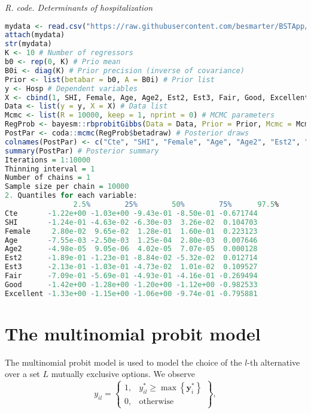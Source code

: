 \begin{tcolorbox}[enhanced,width=4.67in,center upper,
	fontupper=\large\bfseries,drop shadow southwest,sharp corners]
	\textit{R. code. Determinants of hospitalization}
	\begin{VF}
		\begin{lstlisting}[language=R]			
mydata <- read.csv("https://raw.githubusercontent.com/besmarter/BSTApp/refs/heads/master/DataApp/2HealthMed.csv", sep = ",", header = TRUE, quote = "")
attach(mydata)
str(mydata)
K <- 10 # Number of regressors
b0 <- rep(0, K) # Prio mean
B0i <- diag(K) # Prior precision (inverse of covariance)
Prior <- list(betabar = b0, A = B0i) # Prior list
y <- Hosp # Dependent variables
X <- cbind(1, SHI, Female, Age, Age2, Est2, Est3, Fair, Good, Excellent) # Regressors
Data <- list(y = y, X = X) # Data list
Mcmc <- list(R = 10000, keep = 1, nprint = 0) # MCMC parameters
RegProb <- bayesm::rbprobitGibbs(Data = Data, Prior = Prior, Mcmc = Mcmc) # Inference using bayesm package
PostPar <- coda::mcmc(RegProb$betadraw) # Posterior draws
colnames(PostPar) <- c("Cte", "SHI", "Female", "Age", "Age2", "Est2", "Est3", "Fair", "Good", "Excellent") # Names
summary(PostPar) # Posterior summary
Iterations = 1:10000
Thinning interval = 1 
Number of chains = 1 
Sample size per chain = 10000
2. Quantiles for each variable:
				2.5%        25%        50%        75%      97.5%
Cte       -1.22e+00 -1.03e+00 -9.43e-01 -8.50e-01 -0.671744
SHI       -1.24e-01 -4.63e-02 -6.30e-03  3.26e-02  0.104703
Female     2.80e-02  9.65e-02  1.28e-01  1.60e-01  0.223123
Age       -7.55e-03 -2.50e-03  1.25e-04  2.80e-03  0.007646
Age2      -4.98e-05  9.05e-06  4.02e-05  7.07e-05  0.000128
Est2      -1.89e-01 -1.23e-01 -8.84e-02 -5.32e-02  0.012714
Est3      -2.13e-01 -1.03e-01 -4.73e-02  1.01e-02  0.109527
Fair      -7.09e-01 -5.69e-01 -4.93e-01 -4.16e-01 -0.269494
Good      -1.42e+00 -1.28e+00 -1.20e+00 -1.12e+00 -0.982533
Excellent -1.33e+00 -1.15e+00 -1.06e+00 -9.74e-01 -0.795881
\end{lstlisting}
	\end{VF}
\end{tcolorbox} 

\section{The multinomial probit model}\label{sec64}
The multinomial probit model is used to model the choice of the $l$-th alternative over a set $L$ mutually exclusive options.
We observe 
\begin{equation*}
y_{il}=
\begin{Bmatrix}
	1, & y_{il}^*\geq \max\left\{\bm{y}_i^*\right\}  \\
	0, & \text{otherwise}
\end{Bmatrix},
\end{equation*}

